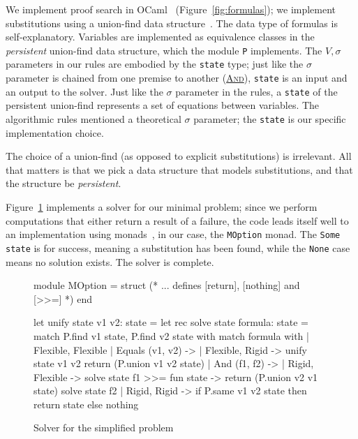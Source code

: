 \documentclass{easychair}
\def\li{\lstinline}
\let\TirName\textsc
\renewcommand{\DefTirName}[1]{\hyperlink{#1}{\TirName {#1}}}
\let\Rule\DefTirName
\newcommand{\fref}[1]{Figure~\ref{fig:#1}}
\begin{document}
We implement proof search in OCaml~\cite{ocaml} (\fref{formulas}); we implement substitutions
using a union-find data structure~\cite{cormen-en,tarjan-75}. The data type of formulas
is self-explanatory. Variables are implemented as equivalence classes in the
\emph{persistent} union-find data structure, which the module \li+P+ implements.
The $V, \sigma$ parameters in our rules are embodied by the \li+state+ type; just
like the $\sigma$ parameter is chained from one premise to another (\Rule{And}),
\li+state+ is an input and an output to the solver. Just like the $\sigma$ parameter
in the rules, a \li+state+ of the persistent union-find represents
a set of equations between variables. The algorithmic rules mentioned a
theoretical $\sigma$ parameter; the \li+state+ is our specific implementation
choice.

The choice of a union-find (as opposed to explicit substitutions) is irrelevant.
All that matters is that we pick a data structure that models substitutions, and
that the structure be \emph{persistent}.

\fref{solver} implements a solver for our minimal problem; since we perform
computations that either return a result of a failure, the code leads itself
well to an implementation using
monads~\cite{wadler-comprehending-92,wadler-essence-92}, in our case, the
\li+MOption+ monad. The \li+Some state+ is for success, meaning a substitution
has been found, while the \li+None+ case means no solution exists. The solver is
complete.

\begin{figure}
  \centering
  \begin{ocaml}
module MOption = struct
  (* ... defines [return], [nothing] and [>>=] *)
end

let unify state v1 v2: state =                  let rec solve state formula: state =
  match P.find v1 state, P.find v2 state with     match formula with
  | Flexible, Flexible                            | Equals (v1, v2) ->
  | Flexible, Rigid ->                                unify state v1 v2
      return (P.union v1 v2 state)                | And (f1, f2) ->
  | Rigid, Flexible ->                                solve state f1 >>= fun state ->
      return (P.union v2 v1 state)                    solve state f2
  | Rigid, Rigid ->
      if P.same v1 v2 state then
        return state
      else
        nothing
  \end{ocaml}
  \caption{Solver for the simplified problem}
  \label{fig:solver}
\end{figure}
\end{document}
